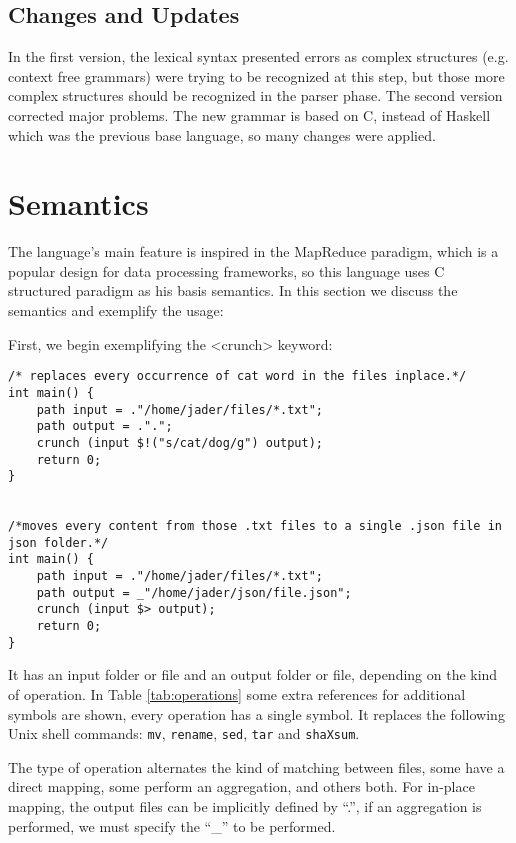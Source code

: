 \documentclass{article}
\begin{document}
\subsection{Changes and Updates}
In the first version, the lexical syntax presented errors as complex structures
(e.g. context free grammars) were trying to be recognized at this step, but
those more complex structures should be recognized in the parser phase. The
second version corrected major problems. The new grammar is based on C, instead
of Haskell which was the previous base language, so many changes were applied.


\section{Semantics}
\label{sec:semantics}
The language's main feature is inspired in the MapReduce paradigm, which is a
popular design for data processing frameworks, so this language uses C
structured paradigm as his basis semantics. In this section we discuss the
semantics and exemplify the usage:

First, we begin exemplifying the <crunch> keyword:

\begin{verbatim}
/* replaces every occurrence of cat word in the files inplace.*/
int main() {
    path input = ."/home/jader/files/*.txt";
    path output = .".";
    crunch (input $!("s/cat/dog/g") output);
    return 0;
}


/*moves every content from those .txt files to a single .json file in json folder.*/
int main() {
    path input = ."/home/jader/files/*.txt";
    path output = _"/home/jader/json/file.json";
    crunch (input $> output);
    return 0;
}
\end{verbatim}

It has an input folder or file and an output folder or file, depending on the
kind of operation.  In Table \ref{tab:operations} some extra references for
additional symbols are shown, every operation has a single symbol. It replaces
the following Unix shell commands: \texttt{mv}, \texttt{rename}, \texttt{sed},
\texttt{tar} and \texttt{shaXsum}.

The type of operation alternates the kind of matching between files, some have
a direct mapping, some perform an aggregation, and others both. For in-place
mapping, the output files can be implicitly defined by ``.'', if an aggregation
is performed, we must specify the  ``\_'' to be performed.
\end{document}
